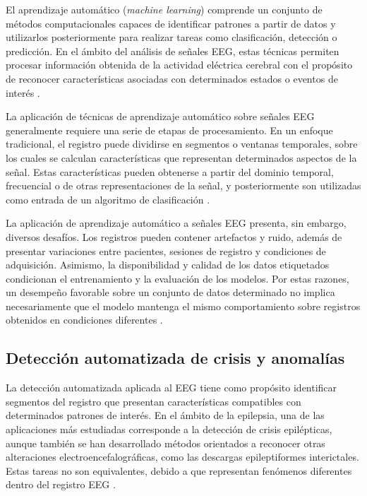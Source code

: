 El aprendizaje automático (\textit{machine learning}) comprende un conjunto de
métodos computacionales capaces de identificar patrones a partir de datos y
utilizarlos posteriormente para realizar tareas como clasificación, detección
o predicción. En el ámbito del análisis de señales EEG, estas técnicas permiten
procesar información obtenida de la actividad eléctrica cerebral con el
propósito de reconocer características asociadas con determinados estados o
eventos de interés \citep{Rasheed2021MachineLearning}.

La aplicación de técnicas de aprendizaje automático sobre señales EEG
generalmente requiere una serie de etapas de procesamiento. En un enfoque
tradicional, el registro puede dividirse en segmentos o ventanas temporales,
sobre los cuales se calculan características que representan determinados
aspectos de la señal. Estas características pueden obtenerse a partir del
dominio temporal, frecuencial o de otras representaciones de la señal, y
posteriormente son utilizadas como entrada de un algoritmo de clasificación
\citep{Rasheed2021MachineLearning}.

La aplicación de aprendizaje automático a señales EEG presenta, sin embargo,
diversos desafíos. Los registros pueden contener artefactos y ruido, además de
presentar variaciones entre pacientes, sesiones de registro y condiciones de
adquisición. Asimismo, la disponibilidad y calidad de los datos etiquetados
condicionan el entrenamiento y la evaluación de los modelos. Por estas
razones, un desempeño favorable sobre un conjunto de datos determinado no
implica necesariamente que el modelo mantenga el mismo comportamiento sobre
registros obtenidos en condiciones diferentes
\citep{Rasheed2021MachineLearning}.

\subsection{Detección automatizada de crisis y anomalías}
\label{subsec:deteccion-automatizada-crisis-anomalias}

La detección automatizada aplicada al EEG tiene como propósito identificar
segmentos del registro que presentan características compatibles con
determinados patrones de interés. En el ámbito de la epilepsia, una de las
aplicaciones más estudiadas corresponde a la detección de crisis epilépticas,
aunque también se han desarrollado métodos orientados a reconocer otras
alteraciones electroencefalográficas, como las descargas epileptiformes
interictales. Estas tareas no son equivalentes, debido a que representan
fenómenos diferentes dentro del registro EEG
\citep{NoachtarRemi2009,Kural2020IEDCriteria}.

